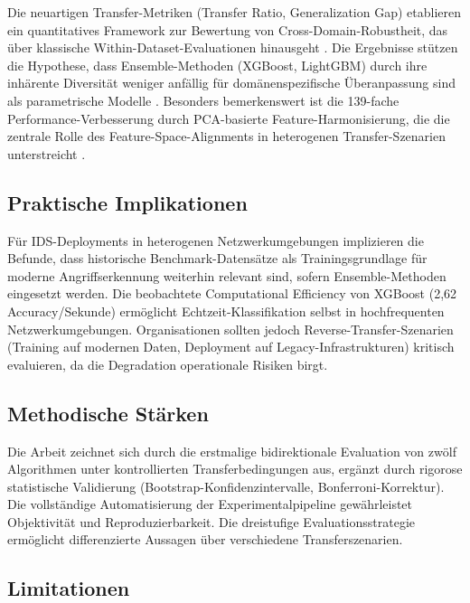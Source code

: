 \documentclass[11pt,a4paper]{article}
\begin{document}
    Die neuartigen Transfer-Metriken (Transfer Ratio, Generalization Gap) etablieren ein quantitatives Framework zur Bewertung von Cross-Domain-Robustheit, das über klassische Within-Dataset-Evaluationen hinausgeht \parencite{Mourouzis2021}. Die Ergebnisse stützen die Hypothese, dass Ensemble-Methoden (XGBoost, LightGBM) durch ihre inhärente Diversität weniger anfällig für domänenspezifische Überanpassung sind als parametrische Modelle \parencite{Hastie2009}. Besonders bemerkenswert ist die 139-fache Performance-Verbesserung durch PCA-basierte Feature-Harmonisierung, die die zentrale Rolle des Feature-Space-Alignments in heterogenen Transfer-Szenarien unterstreicht \parencite{Goodfellow2016}.

    \subsection{Praktische Implikationen}

    Für IDS-Deployments in heterogenen Netzwerkumgebungen implizieren die Befunde, dass historische Benchmark-Datensätze als Trainingsgrundlage für moderne Angriffserkennung weiterhin relevant sind, sofern Ensemble-Methoden eingesetzt werden. Die beobachtete Computational Efficiency von XGBoost (2,62 Accuracy/Sekunde) ermöglicht Echtzeit-Klassifikation selbst in hochfrequenten Netzwerkumgebungen. Organisationen sollten jedoch Reverse-Transfer-Szenarien (Training auf modernen Daten, Deployment auf Legacy-Infrastrukturen) kritisch evaluieren, da die Degradation operationale Risiken birgt.

    \subsection{Methodische Stärken}

    Die Arbeit zeichnet sich durch die erstmalige bidirektionale Evaluation von zwölf Algorithmen unter kontrollierten Transferbedingungen aus, ergänzt durch rigorose statistische Validierung (Bootstrap-Konfidenzintervalle, Bonferroni-Korrektur). Die vollständige Automatisierung der Experimentalpipeline gewährleistet Objektivität und Reproduzierbarkeit. Die dreistufige Evaluationsstrategie ermöglicht differenzierte Aussagen über verschiedene Transferszenarien.

    \subsection{Limitationen}
\end{document}

